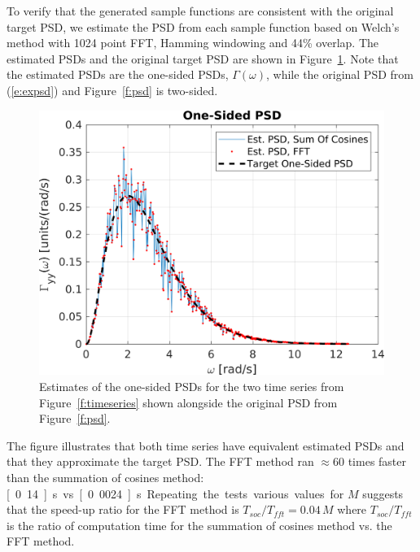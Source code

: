 \documentclass[techreport, article]{npsreport2018}
\begin{document}
To verify that the generated sample functions are consistent with the original target PSD, we estimate the PSD from each sample function based on Welch's method with 1024 point FFT, Hamming windowing and 44\% overlap.  The estimated PSDs and the original target PSD are shown in Figure~\ref{f:psdest}.  Note that the estimated PSDs are the one-sided PSDs, $\Gamma(\omega)$, while the original PSD from (\ref{e:expsd}) and Figure~\ref{f:psd} is two-sided.
\begin{figure}[hbt!]
  \centering
  \includegraphics[width=\FigWidth\textwidth]{images/psdest.png}
  \caption{Estimates of the one-sided PSDs for the two time series from Figure~\ref{f:timeseries} shown alongside the original PSD from Figure~\ref{f:psd}. }
  \label{f:psdest}
\end{figure}
The figure illustrates that both time series have equivalent estimated PSDs and that they approximate the target PSD.  The FFT method ran $\approx 60$ times faster than the summation of cosines method: \unit[0.14]{s} vs. \unit[0.0024]{s}.  Repeating the tests various values for $M$ suggests that the speed-up ratio for the FFT method is $T_{soc}/T_{fft} = 0.04 \, M$ where $T_{soc}/T_{fft}$ is the ratio of computation time for the summation of cosines method vs. the FFT method.




\end{document}
